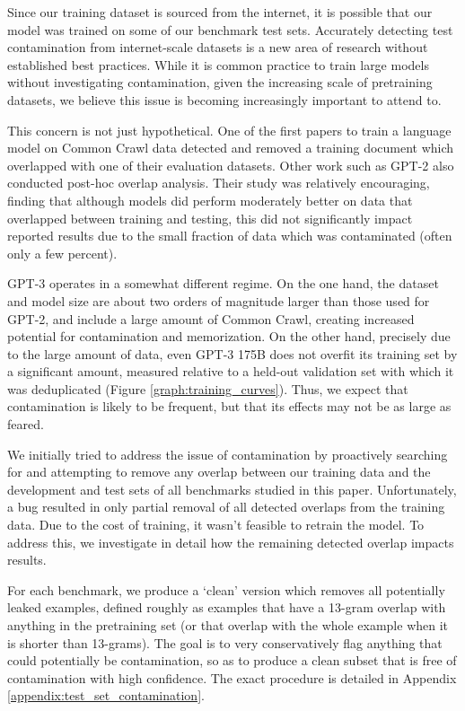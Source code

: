 Since our training dataset is sourced from the internet, it is possible that our model was trained on some of our benchmark test sets.  Accurately detecting test contamination from internet-scale datasets is a new area of research without established best practices. While it is common practice to train large models without investigating contamination, given the increasing scale of pretraining datasets, we believe this issue is becoming increasingly important to attend to.

This concern is not just hypothetical. One of the first papers to train a language model on Common Crawl data \cite{trinh2018simple} detected and removed a training document which overlapped with one of their evaluation datasets. Other work such as GPT-2 \cite{radford2019language} also conducted post-hoc overlap analysis. Their study was relatively encouraging, finding that although models did perform moderately better on data that overlapped between training and testing, this did not significantly impact reported results due to the small fraction of data which was contaminated (often only a few percent).

GPT-3 operates in a somewhat different regime.  On the one hand, the dataset and model size are about two orders of magnitude larger than those used for GPT-2, and include a large amount of Common Crawl, creating increased potential for contamination and memorization.  On the other hand, precisely due to the large amount of data, even GPT-3 175B does not overfit its training set by a significant amount, measured relative to a held-out validation set with which it was deduplicated (Figure \ref{graph:training_curves}).  Thus, we expect that contamination is likely to be frequent, but that its effects may not be as large as feared.

We initially tried to address the issue of contamination by proactively searching for and attempting to remove any overlap between our training data and the development and test sets of all benchmarks studied in this paper. Unfortunately, a bug resulted in only partial removal of all detected overlaps from the training data. Due to the cost of training, it wasn't feasible to retrain the model. To address this, we investigate in detail how the remaining detected overlap impacts results.

For each benchmark, we produce a `clean' version which removes all potentially leaked examples, defined roughly as examples that have a 13-gram overlap with anything in the pretraining set (or that overlap with the whole example when it is shorter than 13-grams). The goal is to very conservatively flag anything that could potentially be contamination, so as to produce a clean subset that is free of contamination with high confidence. The exact procedure is detailed in Appendix \ref{appendix:test_set_contamination}.

